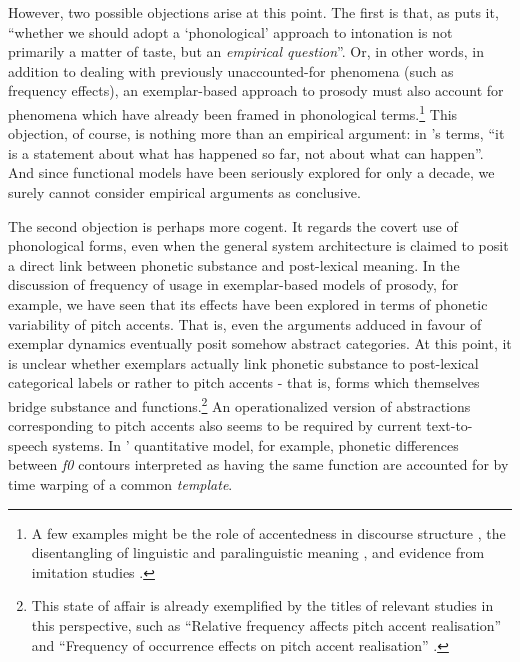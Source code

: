 However, two possible objections arise at this point. The first is that, as \citet[20]{ladd2008intonational} puts it, ``whether we should adopt a `phonological' approach to intonation is not primarily a matter of taste, but an \textit{empirical question}''. Or, in other words, in addition to dealing with previously unaccounted-for phenomena (such as frequency effects), an exemplar-based approach to prosody must also account for phenomena which have already been framed in phonological terms.\footnote{A few examples might be the role of accentedness in discourse structure \citep{hawkins1991factors}, the disentangling of linguistic and paralinguistic meaning \citep{scherer1984vocal}, and evidence from imitation studies \citep{cole2011phonology}.} This objection, of course, is nothing more than an empirical argument: in \citeauthor{smith1981categories}'s \citeyearpar[33]{smith1981categories} terms, ``it is a statement about what has happened so far, not about what can happen''. And since functional models have been seriously explored for only a decade, we surely cannot consider empirical arguments as conclusive.

The second objection is perhaps more cogent. It regards the covert use of phonological forms, even when the general system architecture is claimed to posit a direct link between phonetic substance and post-lexical meaning. In the discussion of frequency of usage in exemplar-based models of prosody, for example, we have seen that its effects have been explored in terms of phonetic variability of pitch accents. That is, even the arguments adduced in favour of exemplar dynamics eventually posit somehow abstract categories. At this point, it is unclear whether exemplars actually link phonetic substance to post-lexical categorical labels or rather to pitch accents - that is, forms which themselves bridge substance and functions.\footnote{This state of affair is already exemplified by the titles of relevant studies in this perspective, such as ``Relative frequency affects pitch accent realisation'' \citep{schweitzer2010relative} and ``Frequency of occurrence effects on pitch accent realisation'' \citep{schweitzer2010frequency}.} An operationalized version of abstractions corresponding to pitch accents also seems to be required by current text-to-speech systems. In \citeauthor{vansanten2000quantitative}' \citeyear[278]{vansanten2000quantitative} quantitative model, for example, phonetic differences between \textit{f0} contours interpreted as having the same function are accounted for by time warping of a common \textit{template}.

